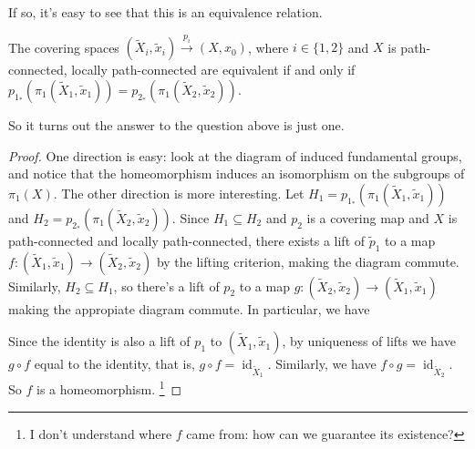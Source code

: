 If so, it's easy to see that this is an equivalence relation.
\begin{theorem}
    The covering spaces $(\widetilde X_i,\widetilde x_i) \overset{p_i}{\to } (X,x_0)$, where $i \in \{1,2\} $ and $X$ is path-connected, locally path-connected are equivalent if and only if $p_{1_*}(\pi_1(\widetilde X_1,\widetilde x_1))=p_{2_*}(\pi_1(\widetilde X_2,\widetilde x_2))$.
\end{theorem}
So it turns out the answer to the question above is just one.
\begin{proof}
    One direction is easy: look at the diagram of induced fundamental groups, and notice that the homeomorphism induces an isomorphism on the subgroups of $\pi_1(X)$. The other direction is more interesting. Let $H_1=p_{1_*}(\pi_1(\widetilde X_1,\widetilde x_1))$ and $H_2=p_{2_*}(\pi_1(\widetilde X_2,\widetilde x_2))$. Since $H_1 \subseteq H_2$ and $p_2$ is a covering map and $X$ is path-connected and locally path-connected, there exists a lift of $\widetilde p_1$ to a map $f\colon(\widetilde X_1,\widetilde x_1) \to (\widetilde X_2,\widetilde x_2)$ by the lifting criterion, making the diagram commute. Similarly, $H_2\subseteq H_1$, so there's a lift of $p_2$ to a map $g \colon (\widetilde X_2,\widetilde x_2) \to (\widetilde X_1,\widetilde x_1)$ making the appropiate diagram commute. In particular, we have 
            \begin{figure}[H]
                \centering
            \end{figure}
            Since the identity is also a lift of $p_1$ to $(\widetilde X_1,\widetilde x_1)$, by uniqueness of lifts we have $g\circ f$ equal to the identity, that is, $g\circ f= \operatorname{id}_{\widetilde X_1}$. Similarly, we have $f\circ g = \operatorname{id}_{\widetilde X_2}$. So $f$ is a homeomorphism. \footnote{I don't understand where $f$ came from: how can we guarantee its existence?}
\end{proof}
